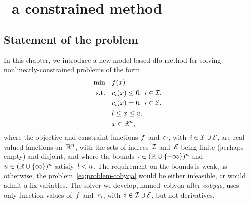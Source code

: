 %
%
%
\chapter{ \textemdash\ a constrained  method}
\label{ch:cobyqa-introduction}

\section{Statement of the problem}

In this chapter, we introduce a new model-based \gls{dfo} method for solving nonlinearly-constrained problems of the form
\begin{subequations}
    \label{eq:problem-cobyqa}
    \begin{align}
        \min        & \quad f(x)\\
        \text{s.t.} & \quad c_{i}(x) \le 0, ~ i \in \mathcal{I}, \label{eq:problem-cobyqa-ub}\\
                    & \quad c_{i}(x) = 0, ~ i \in \mathcal{E},\\
                    & \quad l \le x \le u, \label{eq:problem-cobyqa-bd}\\
                    & \quad x \in \mathbb{R}^n, \nonumber
    \end{align}
\end{subequations}
where the objective and constraint functions~$f$ and~$c_{i}$, with~$i \in \mathcal{I} \cup \mathcal{E}$, are real-valued functions on~$\mathbb{R}^n$, with the sets of indices~$\mathcal{I}$ and~$\mathcal{E}$ being finite (perhaps empty) and disjoint, and where the bounds~$l \in (\mathbb{R} \cup \{-\infty\})^n$ and~$u \in (\mathbb{R} \cup \{\infty\})^n$ satisfy~$l < u$.
The requirement on the bounds is weak, as otherwise, the problem~\cref{eq:problem-cobyqa} would be either infeasible, or would admit a fix variables.
The solver we develop, named~\gls{cobyqa} after \emph{\glsdesc{cobyqa}}, uses only function values of~$f$ and~$c_{i}$, with~$i \in \mathcal{I} \cup \mathcal{E}$, but not derivatives.

